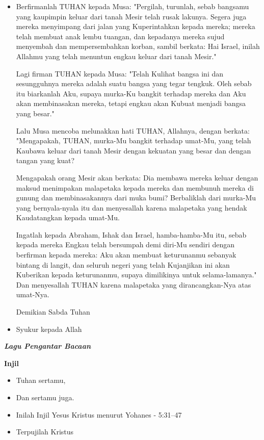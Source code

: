 \documentclass[12pt,twoside]{book}
\makeatletter
\newcommand{\subjudul}[1]{%
  {\parindent \z@ \normalfont
    \interlinepenalty\@M \bfseries #1\par\nobreak \vskip 20\p@ }}
\newcommand{\lagu}[1]{%
  {\parindent \z@ \normalfont
    \interlinepenalty\@M \bfseries \emph{#1}\par\nobreak \vskip 20\p@ }}
\newcommand{\BU}[1]{\begin{itemize} \item[U:] #1 \end{itemize}}
\newcommand{\BI}[1]{\begin{itemize} \item[I:] #1 \end{itemize}}
\newcommand{\BP}[1]{\begin{itemize} \item[P:] #1 \end{itemize}}
\makeatother
\begin{document}
\BP{Berfirmanlah TUHAN kepada Musa: "Pergilah, turunlah, sebab bangsamu yang kaupimpin keluar dari tanah Mesir telah rusak lakunya.
Segera juga mereka menyimpang dari jalan yang Kuperintahkan kepada mereka; mereka telah membuat anak lembu tuangan, dan kepadanya mereka sujud menyembah dan mempersembahkan korban, sambil berkata: Hai Israel, inilah Allahmu yang telah menuntun engkau keluar dari tanah Mesir."

Lagi firman TUHAN kepada Musa: "Telah Kulihat bangsa ini dan sesungguhnya mereka adalah suatu bangsa yang tegar tengkuk.
Oleh sebab itu biarkanlah Aku, supaya murka-Ku bangkit terhadap mereka dan Aku akan membinasakan mereka, tetapi engkau akan Kubuat menjadi bangsa yang besar."

Lalu Musa mencoba melunakkan hati TUHAN, Allahnya, dengan berkata: "Mengapakah, TUHAN, murka-Mu bangkit terhadap umat-Mu, yang telah Kaubawa keluar dari tanah Mesir dengan kekuatan yang besar dan dengan tangan yang kuat?

Mengapakah orang Mesir akan berkata: Dia membawa mereka keluar dengan maksud menimpakan malapetaka kepada mereka dan membunuh mereka di gunung dan membinasakannya dari muka bumi? Berbaliklah dari murka-Mu yang bernyala-nyala itu dan menyesallah karena malapetaka yang hendak Kaudatangkan kepada umat-Mu.

Ingatlah kepada Abraham, Ishak dan Israel, hamba-hamba-Mu itu, sebab kepada mereka Engkau telah bersumpah demi diri-Mu sendiri dengan berfirman kepada mereka: Aku akan membuat keturunanmu sebanyak bintang di langit, dan seluruh negeri yang telah Kujanjikan ini akan Kuberikan kepada keturunanmu, supaya dimilikinya untuk selama-lamanya."
Dan menyesallah TUHAN karena malapetaka yang dirancangkan-Nya atas umat-Nya.

Demikian Sabda Tuhan}

\BU{Syukur kepada Allah}

\lagu{Lagu Pengantar Bacaan}



\subjudul{Injil}
\BI{Tuhan sertamu,}
\BU{Dan sertamu juga.}
\BI{Inilah Injil Yesus Kristus menurut Yohanes - 5:31--47}
\BU{Terpujilah Kristus}
\end{document}
